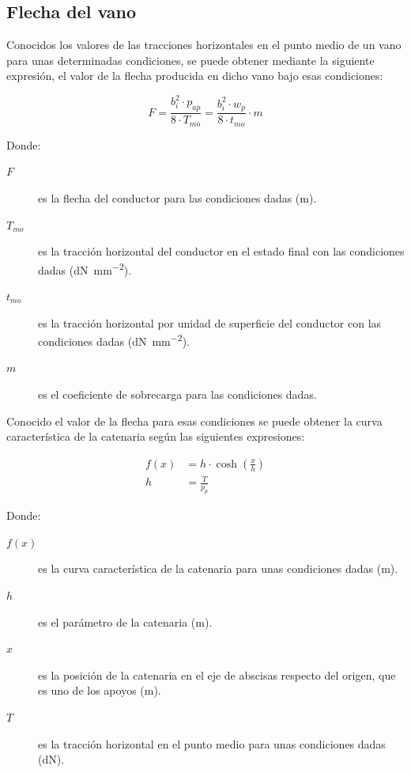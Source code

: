 \subsection{Flecha del vano}
\label{subsec:cm-flecha}
Conocidos los valores de las tracciones horizontales en el punto medio de un vano para unas determinadas condiciones, se puede obtener mediante la siguiente expresión, el valor de la flecha producida en dicho vano bajo esas condiciones:

\begin{equation}
    F = \frac{b_i^2 \cdot p_{ap}}{8 \cdot T_{mo}} = \frac{b_i^2 \cdot w_p}{8 \cdot t_{mo}} \cdot m
    \label{eq:flecha}
\end{equation}

Donde:
\begin{description}
  \item[$F$] es la flecha del conductor para las condiciones dadas (\si{\meter}).
  \item[$T_{mo}$] es la tracción horizontal del conductor en el estado final con las condiciones dadas (\si{\deca\newton\per\milli\meter\squared}).
  \item[$t_{mo}$] es la tracción horizontal por unidad de superficie del conductor con las condiciones dadas (\si{\deca\newton\per\milli\meter\squared}).
  \item[$m$] es el coeficiente de sobrecarga para las condiciones dadas.
\end{description}

Conocido el valor de la flecha para esas condiciones se puede obtener la curva característica de la catenaria según las siguientes expresiones:

\begin{align}
    f(x) &= h\cdot \cosh{(\frac{x}{h})}
    \label{eq:curva-catenaria}\\[0.5em]
    h &= \frac{T}{p_p}
    \label{eq:parametroh-cruva-catenaria}
\end{align}

Donde:
\begin{description}
    \item[$f(x)$] es la curva característica de la catenaria para unas condiciones dadas (\si{\meter}).
    \item[$h$] es el parámetro de la catenaria (\si{\meter}).
    \item[$x$] es la posición de la catenaria en el eje de abscisas respecto del origen, que es uno de los apoyos (\si{\meter}).
    \item[$T$] es la tracción horizontal en el punto medio para unas condiciones dadas (\si{\deca\newton}).
\end{description}

